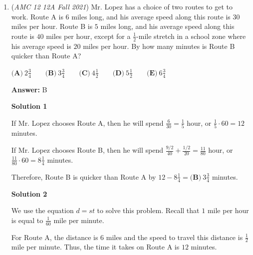 \begin{enumerate}
\textbf{Solution}

We construct the following table:
 \[\begin{array}{c||c|c||c} & & & \\ [-2.5ex] \textbf{Scenario} & \textbf{Length} & \textbf{Width} & \textbf{Area} \\ [0.5ex] \hline & & & \\ [-2ex] \text{Initial} & 4 & 6 & 24 \\ \text{Menkara shortens one side.} & 3 & 6 & 18 \\ \text{Menkara shortens other side instead.} & 4 & 5 & 20 \end{array}\]Therefore, the answer is $\boxed{\textbf{(E) } 20}.$



	\item (\textit{AMC 12 12A Fall 2021}) Mr. Lopez has a choice of two routes to get to work. Route A is $6$ miles long, and his average speed along this route is $30$ miles per hour. Route B is $5$ miles long, and his average speed along this route is $40$ miles per hour, except for a $\frac{1}{2}$-mile stretch in a school zone where his average speed is $20$ miles per hour. By how many minutes is Route B quicker than Route A?


 $\textbf{(A)}\ 2 \frac{3}{4}  \qquad\textbf{(B)}\  3 \frac{3}{4} \qquad\textbf{(C)}\  4 \frac{1}{2} \qquad\textbf{(D)}\  5 \frac{1}{2} \qquad\textbf{(E)}\ 6 \frac{3}{4}$

 \textbf{Answer: }B



\textbf{Solution 1}

If Mr. Lopez chooses Route A, then he will spend $\frac{6}{30}=\frac{1}{5}$ hour, or $\frac{1}{5}\cdot60=12$ minutes.

 If Mr. Lopez chooses Route B, then he will spend $\frac{9/2}{40}+\frac{1/2}{20}=\frac{11}{80}$ hour, or $\frac{11}{80}\cdot60=8\frac14$ minutes.

 Therefore, Route B is quicker than Route A by $12-8\frac14=\boxed{\textbf{(B)}\  3 \frac{3}{4}}$ minutes.

 



\textbf{Solution 2}

We use the equation $d=st$ to solve this problem. Recall that $1$ mile per hour is equal to $\frac{1}{60}$ mile per minute.

 For Route A, the distance is $6$ miles and the speed to travel this distance is $\frac{1}{2}$ mile per minute. Thus, the time it takes on Route A is $12$ minutes.


\end{enumerate}
